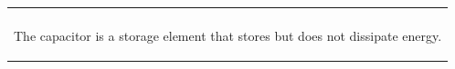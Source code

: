 \documentclass[aspectratio=169]{beamer}
\begin{document}
\begin{frame}[fragile]
\begin{tabular}{r}
\begin{columns}
\begin{column}{.4\textwidth}
					
		\end{column}
	

	
	\end{columns}\\
		\begin{columns}
		\begin{column}{1\textwidth}
\newline	\newline	The capacitor is a storage element that stores but does not dissipate energy.	
		\end{column}
	  \end{columns}\\
	

	
\end{tabular}
	
	
\end{frame}
\end{document}
